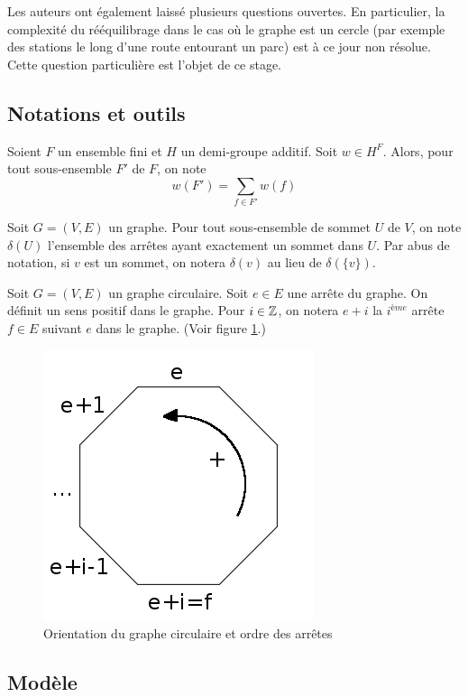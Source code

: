 \documentclass[twoside,11pt,openany,a4paper]{rapport}
\begin{document}
Les auteurs ont également laissé plusieurs questions ouvertes. En particulier, la complexité du rééquilibrage dans le cas où le graphe est un cercle (par exemple des stations le long d'une route entourant un parc) est à ce jour non résolue. Cette question particulière est l'objet de ce stage.

\subsection{Notations et outils}

Soient $F$ un ensemble fini et $H$ un demi-groupe additif. Soit $w \in H^F$. Alors, pour tout sous-ensemble $F'$ de $F$, on note $$w(F') = \sum_{f \in F'} w(f)$$

Soit $G=(V,E)$ un graphe. Pour tout sous-ensemble de sommet $U$ de $V$, on note $\delta(U)$ l'ensemble des arrêtes ayant exactement un sommet dans $U$. Par abus de notation, si $v$ est un sommet, on notera $\delta(v)$ au lieu de $\delta(\{v\})$.

Soit $G=(V,E)$ un graphe circulaire. Soit $e \in E$ une arrête du graphe. On définit un sens positif dans le graphe. Pour $i \in \mathbb{Z}$, on notera $e+i$ la $i^{ème}$ arrête $f \in E$ suivant $e$ dans le graphe. (Voir figure \ref{Notation orientation graphe circulaire}.)

\begin{figure}[ht]
  \centering
  \includegraphics[scale=0.5]{GrapheCirculaire_NotationOrientation.jpg}
  \caption{Orientation du graphe circulaire et ordre des arrêtes}
  \label{Notation orientation graphe circulaire}
\end{figure}

\subsection{Modèle}
\end{document}
